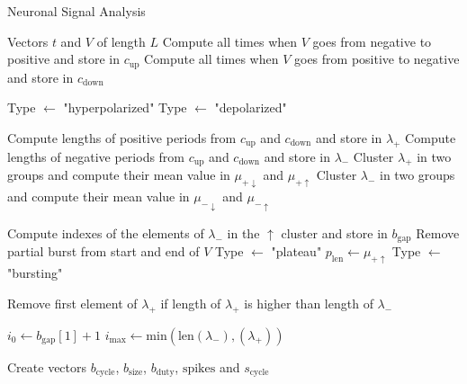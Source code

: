 \begin{algorithm}
    \caption{Neuronal Signal Analysis}
    \begin{algorithmic}[1]
        \Require Vectors $t$ and $V$ of length $L$
        \State Compute all times when $V$ goes from negative to positive and store in $c_\text{up}$
        \State Compute all times when $V$ goes from positive to negative and store in $c_\text{down}$
         
        
                \State Type $\gets$ "hyperpolarized"
            \Else
                \State Type $\gets$ "depolarized"
            \EndIf
            
        \Else
        
            \State Compute lengths of positive periods from $c_\text{up}$ and $c_\text{down}$ and store in $\lambda_+$
            \State Compute lengths of negative periods from $c_\text{up}$ and $c_\text{down}$ and store in $\lambda_-$
            \State Cluster $\lambda_+$ in two groups and compute their mean value in $\mu_{+\downarrow}$ and $\mu_{+\uparrow}$
            \State Cluster $\lambda_-$ in two groups and compute their mean value in $\mu_{-\downarrow}$ and $\mu_{-\uparrow}$
            
            \If{$\mu_{-\uparrow} > 4\mu_{-\downarrow}$} 
                \State Compute indexes of the elements of $\lambda_-$ in the $\uparrow$ cluster and store in $b_\text{gap}$
                \State Remove partial burst from start and end of $V$
                \If{$\mu_{+\uparrow} > 4\mu_{+\downarrow}$} 
                    \State Type $\gets$ "plateau"
                    \State $p_\text{len} \gets \mu_{+\uparrow}$
                \Else
                    \State Type $\gets$ "bursting"
                \EndIf
                
                \State Remove first element of $\lambda_+$ if length of $\lambda_+$ is higher than length of $\lambda_-$
                
                \State $i_0 \gets b_\text{gap}\left[1\right] + 1$  
                \State $i_\text{max} \gets \text{min}\left(\text{len}\left(\lambda_-\right),\left(\lambda_+\right)\right)$ 
                
                \State Create vectors $b_\text{cycle}$, $b_\text{size}$, $b_\text{duty}$, $\text{spikes}$ and $s_\text{cycle}$
                

\end{algorithmic}
\end{algorithm}
